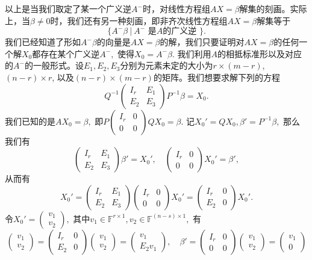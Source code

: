 以上是当我们取定了某一个广义逆$A^-$时，对线性方程组$AX = \beta$解集的刻画。实际上，当$\beta \neq 0$时，我们还有另一种刻画，即非齐次线性方程组$AX = \beta$解集等于
$$\{ A^-\beta ~|~ A^- \text{ 是$A$的广义逆 } \}.$$
我们已经知道了形如$A^-\beta$的向量是$AX = \beta$的解，我们只要证明对$AX = \beta$的任何一个解$X_0$都存在某个广义逆$A^-,$ 使得$X_0 = A^-\beta.$ 我们利用$A$的相抵标准形以及对应的$A^-$的一般形式。设$E_1, E_2, E_3$分别为元素未定的大小为$r \times (m-r)$, $(n-r) \times r$, 以及$(n-r) \times (m-r)$的矩阵。我们想要求解下列的方程
$$Q^{-1} \begin{pmatrix} I_r & E_1 \\ E_2 & E_3 \end{pmatrix} P^{-1} \beta = X_0.$$
我们已知的是$AX_0 = \beta,$ 即$P \begin{pmatrix} I_r & 0 \\ 0 & 0 \end{pmatrix} Q X_0 = \beta.$ 记$X_0' = QX_0, \beta' = P^{-1}\beta,$ 那么我们有
$$\begin{pmatrix} I_r & E_1 \\ E_2 & E_3 \end{pmatrix} \beta' = X_0', \quad \begin{pmatrix} I_r & 0 \\ 0 & 0 \end{pmatrix} X_0' = \beta',$$
从而有
$$X_0' = \begin{pmatrix} I_r & E_1 \\ E_2 & E_3 \end{pmatrix} \begin{pmatrix} I_r & 0 \\ 0 & 0 \end{pmatrix} X_0' = \begin{pmatrix} I_r & 0 \\ E_2 & 0 \end{pmatrix} X_0'.$$
令$X_0' = \begin{pmatrix} v_1 \\ v_2 \end{pmatrix},$ 其中$v_1 \in \mathbb{F}^{r \times 1}, v_2 \in \mathbb{F}^{(n-s)\times 1},$ 有
$$\begin{pmatrix} v_1 \\ v_2 \end{pmatrix} = \begin{pmatrix} I_r & 0 \\ E_2 & 0 \end{pmatrix} \begin{pmatrix} v_1 \\ v_2 \end{pmatrix} = \begin{pmatrix} v_1 \\ E_2v_1 \end{pmatrix}, \quad \beta' = \begin{pmatrix} I_r & 0 \\ 0 & 0 \end{pmatrix} \begin{pmatrix} v_1 \\ v_2 \end{pmatrix} = \begin{pmatrix} v_1 \\ 0 \end{pmatrix}$$
